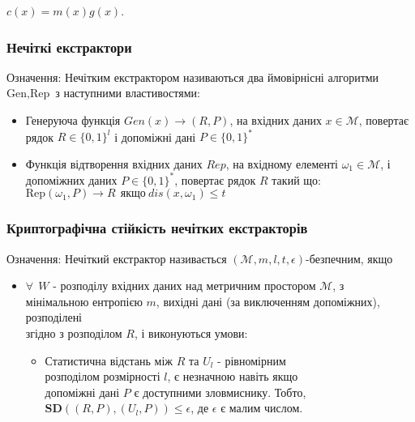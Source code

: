 \documentclass[11pt]{article}
\providecommand{\tightlist}{%
      \setlength{\itemsep}{0pt}\setlength{\parskip}{0pt}}
\begin{document}
$ c (x) = m (x) g (x) $.

    \hypertarget{ux43dux435ux447ux456ux442ux43aux456-ux435ux43aux441ux442ux440ux430ux43aux442ux43eux440ux438}{%
\subsubsection{Нечіткі
екстрактори}\label{ux43dux435ux447ux456ux442ux43aux456-ux435ux43aux441ux442ux440ux430ux43aux442ux43eux440ux438}}

Означення: Нечітким екстрактором називаються два ймовірнісні алгоритми
\(\text{Gen}, \text{Rep}\) з наступними властивостями:

\begin{itemize}
\tightlist
\item
  Генеруюча функція \(Gen(x) \rightarrow (R,P)\), на вхідних даних
  \(x \in \mathcal{M}\), повертає рядок \(R \in \{0,1\}^l\) і допоміжні
  дані \(P \in \{0,1\}^*\)
\item
  Функція відтворення вхідних даних \(Rep\), на вхідному елементі
  \(\omega_1 \in \mathcal{M}\), і допоміжних даних \(P \in \{0,1\}^*\),
  повертає рядок \(R\) такий що:\\
  \(\text{Rep}(\omega_1,P) \rightarrow R~~\text{якщо}~  dis(x,\omega_1)\leq t\)
\end{itemize}

    \hypertarget{ux43aux440ux438ux43fux442ux43eux433ux440ux430ux444ux456ux447ux43dux430-ux441ux442ux456ux439ux43aux456ux441ux442ux44c-ux43dux435ux447ux456ux442ux43aux438ux445-ux435ux43aux441ux442ux440ux430ux43aux442ux43eux440ux456ux432}{%
\subsubsection{Криптографічна стійкість нечітких
екстракторів}\label{ux43aux440ux438ux43fux442ux43eux433ux440ux430ux444ux456ux447ux43dux430-ux441ux442ux456ux439ux43aux456ux441ux442ux44c-ux43dux435ux447ux456ux442ux43aux438ux445-ux435ux43aux441ux442ux440ux430ux43aux442ux43eux440ux456ux432}}

Означення: Нечіткий екстрактор називається
\((\mathcal{M},m,l,t,\epsilon)\)-безпечним, якщо

\begin{itemize}
\tightlist
\item
  \(\forall ~~ W\) - розподілу вхідних даних над метричним простором
  \(\mathcal{M}\), з\\
  мінімальною ентропією \(m\), вихідні дані (за виключенням допоміжних),
  розподілені\\
  згідно з розподілом \(R\), і виконуються умови:

  \begin{itemize}
  \tightlist
  \item
    Статистична відстань між \(R\) та \(U_l\) - рівномірним\\
    розподілом розмірності \(l\), є незначною навіть якщо\\
    допоміжні дані \(P\) є доступними зловмиснику. Тобто,
    \(\textbf{SD}((R,P),(U_l,P)) \leq \epsilon\), де \(\epsilon\) є
    малим числом.
  \end{itemize}
\end{itemize}
\end{document}
